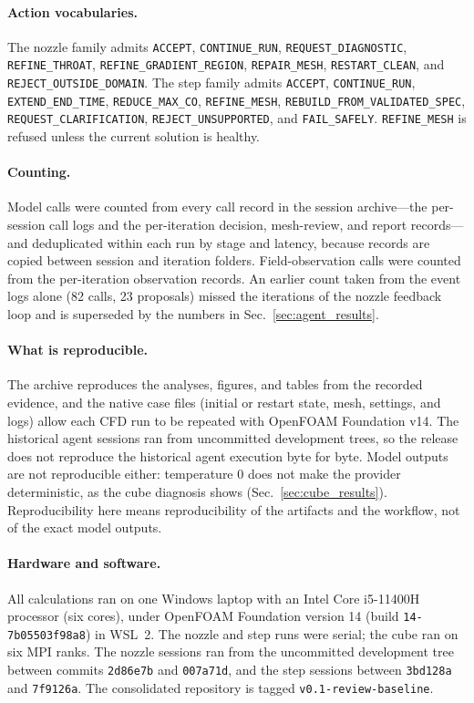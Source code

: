 \documentclass[11pt]{article}
\begin{document}
{\sloppy\paragraph{Action vocabularies.} The nozzle family
admits \texttt{ACCEPT}, \texttt{CONTINUE\_RUN},
\texttt{REQUEST\_DIAGNOSTIC}, \texttt{REFINE\_THROAT},
\texttt{REFINE\_GRADIENT\_REGION}, \texttt{REPAIR\_MESH},
\texttt{RESTART\_CLEAN}, and \texttt{REJECT\_OUTSIDE\_DOMAIN}. The step
family admits \texttt{ACCEPT}, \texttt{CONTINUE\_RUN},
\texttt{EXTEND\_END\_TIME}, \texttt{REDUCE\_MAX\_CO},
\texttt{REFINE\_MESH}, \texttt{REBUILD\_FROM\_VALIDATED\_SPEC},
\texttt{REQUEST\_CLARIFICATION}, \texttt{REJECT\_UNSUPPORTED}, and
\texttt{FAIL\_SAFELY}. \texttt{REFINE\_MESH} is refused unless the current solution is
healthy.\par}

\paragraph{Counting.} Model calls were counted from every call record in the
session archive---the per-session call logs and the per-iteration decision,
mesh-review, and report records---and deduplicated within each run by stage
and latency, because records are copied between session and iteration
folders. Field-observation calls were counted from the per-iteration
observation records. An earlier count taken from the event logs alone (82
calls, 23 proposals) missed the iterations of the nozzle feedback loop and
is superseded by the numbers in Sec.~\ref{sec:agent_results}.

\paragraph{What is reproducible.} The archive reproduces the analyses,
figures, and tables from the recorded evidence, and the native case files
(initial or restart state, mesh, settings, and logs) allow each CFD run to be
repeated with OpenFOAM Foundation v14. The historical agent sessions ran from uncommitted
development trees, so the release does not reproduce the historical agent
execution byte for byte. Model outputs are not reproducible either:
temperature 0 does not make the provider deterministic, as the cube
diagnosis shows (Sec.~\ref{sec:cube_results}). Reproducibility here means
reproducibility of the artifacts and the workflow, not of the exact model
outputs.

\paragraph{Hardware and software.} All calculations ran on one Windows laptop
with an Intel Core i5-11400H processor (six cores), under OpenFOAM Foundation
version 14 (build \texttt{14-7b05503f98a8}) in WSL~2. The nozzle and step runs
were serial; the cube ran on six MPI ranks. The nozzle sessions ran from the
uncommitted development tree between commits \texttt{2d86e7b} and
\texttt{007a71d}, and the step sessions between \texttt{3bd128a} and
\texttt{7f9126a}. The consolidated repository is tagged
\texttt{v0.1-review-baseline}.
\end{document}
